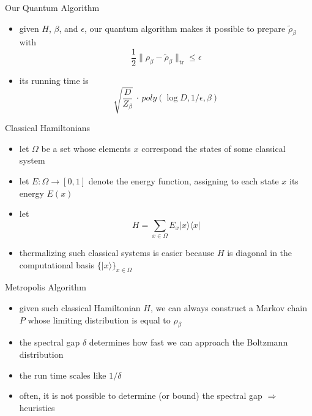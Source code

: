\documentclass[slideColor]{prosper}
\renewcommand{\>}{\rangle}
\newcommand{\<}{\langle}
\begin{document}
\begin{slide}{Our Quantum Algorithm}
\begin{itemize}
\item given $H$, $\beta$, and $\epsilon$, our quantum algorithm makes it possible to prepare $\tilde{\rho}_\beta$ with
\[
\frac{1}{2} \| \rho_\beta - \tilde{\rho}_\beta \|_{\mathrm{tr}} \le \epsilon 
\]

\bigskip
\item its running time is
\[
\sqrt{\frac{D}{Z_\beta}} \, \cdot \, poly(\log D, 1/\epsilon, \beta)
\]
\end{itemize}
\end{slide}


\begin{slide}{Classical Hamiltonians}
\begin{itemize}
\item let $\Omega$ be a set whose elements $x$ correspond the states of some classical system

\medskip
\item let $E : \Omega\rightarrow [0,1]$ denote the energy function, assigning to each state $x$ its energy $E(x)$

\medskip
\item let 
\[
H = \sum_{x\in\Omega} E_x |x\>\<x|
\]

\medskip 
\item thermalizing such classical systems is easier because $H$ is diagonal in the computational basis $\{ |x\> \}_{x\in\Omega}$
\end{itemize}

\end{slide}


\begin{slide}{Metropolis Algorithm}
\begin{itemize}
\item given such classical Hamiltonian $H$, we can always construct a Markov chain $P$ whose limiting distribution is equal to $\rho_\beta$

\medskip
\item the spectral gap $\delta$ determines how fast we can approach the Boltzmann distribution

\medskip
\item the run time scales like $1/\delta$

\medskip
\item often, it is not possible to determine (or bound) the spectral gap $\Rightarrow$ heuristics

\end{itemize}
\end{slide}
\end{document}
